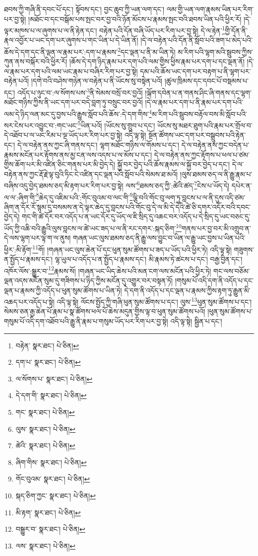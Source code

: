 ཐབས་ཀྱི་གཞི་ནི་དབང་པོ་དང་། སྟོབས་དང་། བྱང་ཆུབ་ཀྱི་ཡན་ལག་དང་། ལམ་གྱི་ཡན་ལག་རྣམས་ཡིན་པར་རིག་པར་བྱ་སྟེ། །མཐོང་བ་དང་བསྒོམ་པས་སྤང་བར་བྱ་བའི་ཉོན་མོངས་པ་རྣམས་སྤང་བའི་ཐབས་ཡིན་པའི་ཕྱིར་རོ། །དེ་ལྟར་མཁས་པ་ལ་ཞུགས་པ་ལ་ནི་རྟེན་དང་། བརྟེན་པའི་དོན་བཞི་ཡོད་པར་རིག་པར་བྱ་སྟེ། དེ་ལ་རྟེན་\footnote{བརྟེན་  སྣར་ཐང་།  པེ་ཅིན། }གྱི་དོན་ནི་རྣལ་འབྱོར་པ་ཡང་དག་པར་ཞུགས་པ་གང་ཡིན་པ་དེ་ཡིན་ནོ། །དེ་ལ་བརྟེན་པའི་དོན་ནི་སློབ་པའི་ཟག་པ་མེད་པའི་ཆོས་དེ་དག་དང་ནི་ལྡན་ལ་རྣམ་པར་:དག་པ་རྣམས་\footnote{དག་པ་  སྣར་ཐང་།  པེ་ཅིན། }དང་ལྡན་པ་ནི་མ་ཡིན་ཏེ། མ་རིག་པའི་ལྷག་མའི་སྦུབས་ཀྱིས་ཀུན་ནས་བསྐོར་བའི་ཕྱིར་རོ། །ཆོས་དེ་དག་ཉིད་རྣམ་པར་དག་པའི་ལམ་གྱིས་ཕྱིས་རྣམ་པར་དག་པ་དང་ལྡན་ནོ། །དེ་ལ་རྣམ་པར་དག་པའི་ལམ་ཡང་རྣམ་པ་བཞིར་རིག་པར་བྱ་སྟེ། དམ་པའི་ཆོས་ཡང་དག་པར་བརྟག་པ་ནི་ལྷག་པར་བརྟེན་པའོ། །དགེ་བའི་བཤེས་གཉེན་ལ་བརྟེན་པ་ནི་ཡོངས་སུ་བསྟེན་པའོ། །ཚུལ་ཁྲིམས་དང་དབང་པོ་བསྡམས་པ་དང་། འདོད་པ་ཉུང་བ་:ལ་སོགས་པས་\footnote{ལ་སོགས་པ་  སྣར་ཐང་།  པེ་ཅིན། }ནི་སེམས་བསྲོ་བར་བྱའོ། །ལྐོག་དབེན་པ་ན་གནས་ཤིང་ཞི་གནས་དང་ལྷག་མཐོང་གཉིས་ཀྱིས་ནི་ཡང་དག་པར་བདེ་བླག་ཏུ་བསྲུང་བར་བྱའོ། །དེ་ལ་རྣམ་པར་དག་པ་ནི་རྣམ་པར་དག་པའི་ལམ་དེ་ཉིད་ལན་མང་དུ་བྱས་པའི་རྒྱུས་སློབ་པའི་ཆོས་:དེ་དག་གིས་\footnote{དེ་དག་གི་  སྣར་ཐང་།  པེ་ཅིན། }མ་རིག་པའི་སྦུབས་བརྟོལ་བས་མི་སློབ་པའི་སར་ངེས་པར་འབྱུང་བ་:གང་ཡང་\footnote{གང་  སྣར་ཐང་།  པེ་ཅིན། }ཡིན་པའོ། །ཡོངས་སུ་གྲུབ་པ་དང་། ཡོངས་སུ་མཐར་ཐུག་པའི་རྣམ་པར་གྲོལ་བ་དེ་འཐོབ་པ་ལ་ཡང་རིམ་པ་ལྔ་ཡོད་པར་རིག་པར་བྱ་སྟེ། འདི་ལྟ་སྟེ། སྔོན་ཚོགས་ཡང་དག་པར་བསྒྲུབས་པའི་རྟེན་དང་། དེ་ལ་བརྟེན་ནས་ཀྱང་ཞི་གནས་དང་། ལྷག་མཐོང་གཉིས་ལ་གོམས་པ་དང་། དེ་ལ་བརྟེན་ནས་ཀྱང་བདེན་པ་རྣམས་མངོན་པར་རྟོགས་ནས་མྱ་ངན་ལས་འདས་པ་ལ་མོས་པ་དང་། དེ་ལ་བརྟེན་ནས་ཀྱང་རྟོགས་པ་ཕལ་པ་ཙམ་གྱིས་ཆོག་པར་མི་འཛིན་ཅིང་གནས་པར་མི་བྱེད་དེ། སྐྱོ་བར་བྱེད་པའི་ཆོས་རྣམས་ལ་སྐྱོ་བར་བྱེད་པ་དང་། དེ་ལ་བརྟེན་ནས་ཀྱང་རྡོ་རྗེ་ལྟ་བུའི་ཏིང་ངེ་འཛིན་དང་ལྡན་པའི་སློབ་པའི་སེམས་ཐ་མའོ། །ལུས་ཐམས་ཅད་ལ་ནི་རྒྱུ་རྣམ་པ་བཞིས་འདུ་བྱེད་ཐམས་ཅད་མི་རྟག་པར་རིག་པར་བྱ་སྟེ། ལས་\footnote{ལུས་  སྣར་ཐང་།  པེ་ཅིན། }ཐམས་ཅད་ཀྱི་:ཚེའི་ཚད་\footnote{ཚེའི་  སྣར་ཐང་།  པེ་ཅིན། }ངེས་པ་ཡོད་དེ། དཔེར་ན་ལ་ལ་:ཞིག་གི་\footnote{ཞིག་གིས་  སྣར་ཐང་།  པེ་ཅིན། }ཆེད་དུ་འཇིམ་པའི་:གོང་བུའམ་བ་ལང་གི་\footnote{གོང་བུའམ་  སྣར་ཐང་།  པེ་ཅིན། }ལྕི་བའི་གོང་བུ་ལག་ཏུ་བླངས་པ་ལ་ནི་དུས་འདི་ཙམ་ཞིག་ན་དོར་རོ་སྙམ་དུ་བསམས་ན་དེ་ལྟར་ཆེད་དུ་བླངས་པའི་གོང་བུ་དེ་ལ་མི་དེ་དེའི་ཚེ་ཅི་དགར་འདོར་བའི་དབང་བྱེད་དེ། གང་གི་ཚེ་དོར་བར་འདོད་པ་ན་ཡང་དོར་དུ་ཡོད་ལ་ཇི་སྲིད་དུ་འཆང་བར་འདོད་པ་དེ་སྲིད་དུ་ཡང་བཅང་དུ་ཡོད་ཀྱི་འཆི་བའི་རྒྱུའི་ལུས་བླངས་ལ་ཚེ་ཡང་ཟད་པ་ལ་ནི་རང་དགར་:སྐད་ཅིག་\footnote{སྐད་ཅིག་ཀྱང་  སྣར་ཐང་།  པེ་ཅིན། }གནས་པར་བྱ་བར་མི་འགྲུབ་ན་དེ་ལས་ལྷག་པར་ལྟ་ག་ལ་ནུས། གཞན་ཡང་ལུས་ཐམས་ཅད་ནི་རྒྱུ་ལས་བྱུང་བ་ཡིན་ལ་རྒྱུ་ཡང་བྱས་པ་ཡིན་པའི་ཕྱིར་:མི་རྟོག་\footnote{མི་རྟག་  སྣར་ཐང་།  པེ་ཅིན། }གོ། །གཞན་ཡང་ལུས་ཆེན་པོ་དང་ཕུན་སུམ་ཚོགས་པ་ཟད་པ་ཡོད་པའི་ཕྱིར་ཏེ། འདི་ལྟ་སྟེ། གཟུགས་ན་སྤྱོད་པ་རྣམས་དང་། ལྷ་ཡུལ་པ་འདོད་པ་ན་སྤྱོད་པ་རྣམས་དང་། མི་རྣམས་ཏེ་ཚངས་པ་དང་། བརྒྱ་བྱིན་དང་། འཁོར་ལོས་:སྒྱུར་བ་\footnote{བསྒྱུར་བ་  སྣར་ཐང་།  པེ་ཅིན། }རྣམས་སོ། །གཞན་ཡང་ཡིད་ཆེས་པའི་མན་ངག་ལས་མངོན་པའི་ཕྱིར་ཏེ། གང་ལས་བཅོམ་ལྡན་འདས་མངོན་སུམ་དུ་གཟིགས་པ་ཉིད་ཀྱིས་མངོན་དུ་འགྱུར་བར་བསྟན་ཏོ། །གསུམ་པོ་འདི་དག་ནི་འདོད་པ་དང་ལྡན་པ་རྣམས་ཀྱི་འདོད་པ་ཕུན་སུམ་ཚོགས་པ་ཡིན་ཏེ། དེ་དག་ནི་འདོད་པ་དང་ལྡན་པ་རྣམས་ཀྱིས་རྟག་ཏུ་རྒྱུན་མི་འཆད་པར་འདོད་པ་སྟེ། འདི་ལྟ་སྟེ། ལོངས་སྤྱོད་ཀྱི་གཞི་ཕུན་སུམ་ཚོགས་པ་དང་། ལུས་\footnote{ལས་  སྣར་ཐང་།  པེ་ཅིན། }ཕུན་སུམ་ཚོགས་པ་དང་། སེམས་ཅན་རྒྱ་ཆེན་པོ་རྣམ་པ་སྣ་ཚོགས་ཕལ་པོ་ཆེས་མདུན་གྱིས་ལྟ་བ་ཕུན་སུམ་ཚོགས་པའོ། །ཕུན་སུམ་ཚོགས་པ་གསུམ་པོ་འདི་དག་འཐོབ་པའི་རྒྱུ་ནི་རྣམ་པ་གསུམ་ཡོད་པར་རིག་པར་བྱ་སྟེ། འདི་ལྟ་སྟེ། སྦྱིན་པ་དང་། 